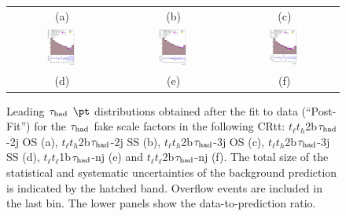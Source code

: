 \begin{figure}[H]
\begin{tabular}{@{}ccc@{}}
(a) & (b) & (c) \\
\includegraphics[page=1,width=0.29\textwidth]{figures/ttCR/tuH_reg1l1tau2b3j_ss_log_ttCR.pdf}&
\includegraphics[page=1,width=0.29\textwidth]{figures/ttCR/tuH_reg2l1tau1bnj_log_ttCR.pdf}&
\includegraphics[page=1,width=0.29\textwidth]{figures/ttCR/tuH_reg2l1tau2bnj_log_ttCR.pdf}\\
(d) & (e) & (f)\\
\end{tabular}
\caption{Leading $\tau_\text{had}$ $\pt$  distributions obtained after the fit to data (``Post-Fit'') for the $\tau_\text{had}$ fake scale factors in the following CRtt:
  $t_{\ell}t_{h}$2b$\tau_\text{had}$-2j OS (a), $t_{\ell}t_{h}$2b$\tau_\text{had}$-2j SS (b), $t_{\ell}t_{h}$2b$\tau_\text{had}$-3j OS (c), $t_{\ell}t_{h}$2b$\tau_\text{had}$-3j SS (d),
  $t_{\ell}t_{\ell}$1b$\tau_\text{had}$-nj (e) and $t_{\ell}t_{\ell}$2b$\tau_\text{had}$-nj (f).
  The total size of the statistical and systematic uncertainties of the background prediction is indicated by the hatched band.
  Overflow events are included in the last bin. The lower panels show the data-to-prediction ratio.}
\label{fig:ttCR_mtt}
\end{figure}

